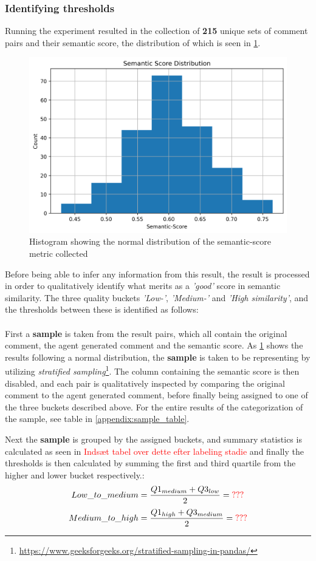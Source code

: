 \subsubsection{Identifying thresholds}
\label{sec:identifying thresholds}
Running the experiment resulted in the collection of \textbf{215} unique sets of comment pairs and their semantic score, the distribution of which is seen in \cref{fig:sem_hist}.
\begin{figure}[H]
\centering
\includegraphics[width=0.7\linewidth]{Figures/semantic_score_histogram.png}
\caption{Histogram showing the normal distribution of the semantic-score metric collected}
\label{fig:sem_hist}
\end{figure}

Before being able to infer any information from this result, the result is processed in order to qualitatively identify what merits as a \textit{'good'} score in semantic similarity. The three quality buckets \textit{'Low-'}, \textit{'Medium-'} and \textit{'High similarity'}, and the thresholds between these is identified as follows:
\\\\
First a \textbf{sample} is taken from the result pairs, which all contain the original comment, the agent generated comment and the semantic score. As \cref{fig:sem_hist} shows the results following a normal distribution, the \textbf{sample} is taken to be representing by utilizing \textit{stratified sampling}\footnote{\url{https://www.geeksforgeeks.org/stratified-sampling-in-pandas/}}. The column containing the semantic score is then disabled, and each pair is qualitatively inspected by comparing the original comment to the agent generated comment, before finally being assigned to one of the three buckets described above. For the entire results of the categorization of the sample, see table in \cref{appendix:sample_table}.

Next the \textbf{sample} is grouped by the assigned buckets, and summary statistics is calculated as seen in \textcolor{red}{Indsæt tabel over dette efter labeling stadie} and finally the thresholds is then calculated by summing the first and third quartile from the higher and lower bucket respectively.:
\[
Low\_to\_medium = \frac{Q1_{medium}+Q3_{low}}{2} = \textcolor{red}{???}
\]
\[
Medium\_to\_high = \frac{Q1_{high}+Q3_{medium}}{2} = \textcolor{red}{???}
\]

